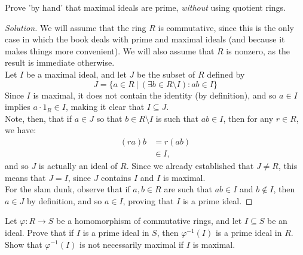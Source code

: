 \documentclass[12pt]{article}
\newenvironment{problem}[2][Problem]{\begin{trivlist}
\item[\hskip \labelsep {\bfseries #1}\hskip \labelsep {\bfseries #2.}]}{\end{trivlist}}
\newenvironment{solution}
  {\renewcommand\qedsymbol{$\blacksquare$}\begin{proof}[Solution]}
{\end{proof}}
\theoremstyle{remark}
\begin{document}
\begin{problem}{4.14}
  Prove 'by hand' that maximal ideals are prime, \textit{without} using 
  quotient rings.
\end{problem}
\begin{solution}
  We will assume that the ring $R$ is commutative, since this is the only case in which the book
  deals with prime and maximal ideals (and because it makes things more convenient).
  We will also assume that $R$ is nonzero, as the result is immediate otherwise. \\
  \indent Let $I$ be a maximal ideal, and let $J$ be the subset of $R$ defined by\\
  \begin{equation*}
    J = \{a\in R\ |\ (\exists b\in R\setminus I): ab\in I \}
  \end{equation*}
  \indent Since $I$ is maximal, it does not contain the identity (by definition), and so
  $a\in I$ implies $a\cdot1_R\in I$, making it clear that $I\subseteq J$. \\
  \indent Note, then, that if $a\in J$ so that $b\in R\setminus I$ is such that $ab\in I$,
  then for any $r\in R$, we have:
  \begin{align*}
    (ra)b &= r(ab) \\
    &\in I,
  \end{align*}
  and so $J$ is actually an ideal of $R$.
  Since we already established that $J\neq R$, this means that $J=I$, since $J$ contains $I$ 
  and $I$ is maximal.\\
  \indent For the slam dunk, observe that if $a,b\in R$ are such that $ab\in I$ and $b\notin I$,
  then $a\in J$ by definition, and so $a\in I$, proving that $I$ is a prime ideal.
\end{solution}

\begin{problem}{4.15}
  Let $\varphi:R\to S$ be a homomorphism of commutative rings, and let $I\subseteq S$
  be an ideal.
  Prove that if $I$ is a prime ideal in $S$, then $\varphi^{-1}(I)$ is a prime ideal in $R$.
  Show that $\varphi^{-1}(I)$ is not necessarily maximal if $I$ is maximal.
\end{problem}
\end{document}
